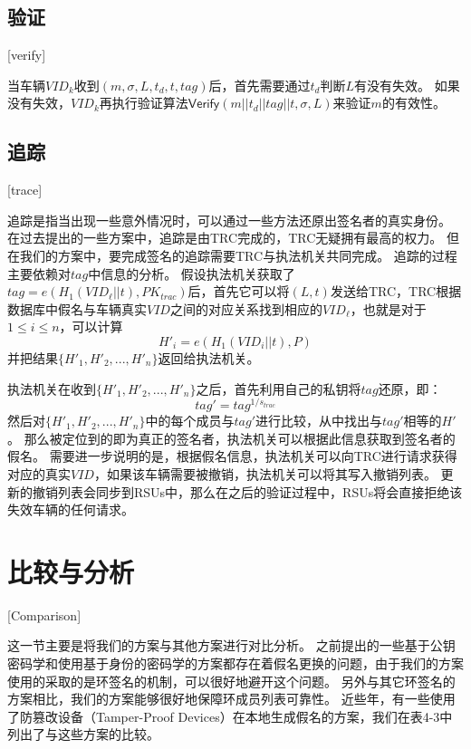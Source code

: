 \subsection{验证}[verify]

当车辆$VID_k$收到$(m,\sigma,L,t_d,t,tag)$后，首先需要通过$t_d$判断$L$有没有失效。
如果没有失效，$VID_k$再执行验证算法$\mathsf{Verify}(m||t_d||tag||t,\sigma,L)$来验证$m$的有效性。

\subsection{追踪}[trace]

追踪是指当出现一些意外情况时，可以通过一些方法还原出签名者的真实身份。
在过去提出的一些方案中，追踪是由TRC完成的，TRC无疑拥有最高的权力。
但在我们的方案中，要完成签名的追踪需要TRC与执法机关共同完成。
追踪的过程主要依赖对$tag$中信息的分析。
假设执法机关获取了$tag=e(H_1(VID_\ell||t),PK_{trac})$后，首先它可以将$(L,t)$发送给TRC，TRC根据数据库中假名与车辆真实$VID$之间的对应关系找到相应的$VID_\ell$，也就是对于$1\leq i \leq n$，可以计算
\begin{equation}
H'_i=e(H_1(VID_i||t),P)
\end{equation}
并把结果$\{H'_1,H'_2,...,H'_n\}$返回给执法机关。

执法机关在收到$\{H'_1,H'_2,...,H'_n\}$之后，首先利用自己的私钥将$tag$还原，即：
$$tag'=tag^{1/s_{trac}}$$
然后对$\{H'_1,H'_2,...,H'_n\}$中的每个成员与$tag'$进行比较，从中找出与$tag'$相等的$H'$。
那么被定位到的即为真正的签名者，执法机关可以根据此信息获取到签名者的假名。
需要进一步说明的是，根据假名信息，执法机关可以向TRC进行请求获得对应的真实$VID$，如果该车辆需要被撤销，执法机关可以将其写入撤销列表。
更新的撤销列表会同步到RSUs中，那么在之后的验证过程中，RSUs将会直接拒绝该失效车辆的任何请求。

\section{比较与分析}[Comparison]

这一节主要是将我们的方案与其他方案进行对比分析。
之前提出的一些基于公钥密码学和使用基于身份的密码学的方案都存在着假名更换的问题，由于我们的方案使用的采取的是环签名的机制，可以很好地避开这个问题。
另外与其它环签名的方案相比，我们的方案能够很好地保障环成员列表可靠性。
近些年，有一些使用了防篡改设备（Tamper-Proof Devices）在本地生成假名的方案\cite{yang2019lightweight,tzeng2017enhancing,lee2013toward}，我们在表4-3中列出了与这些方案的比较。

